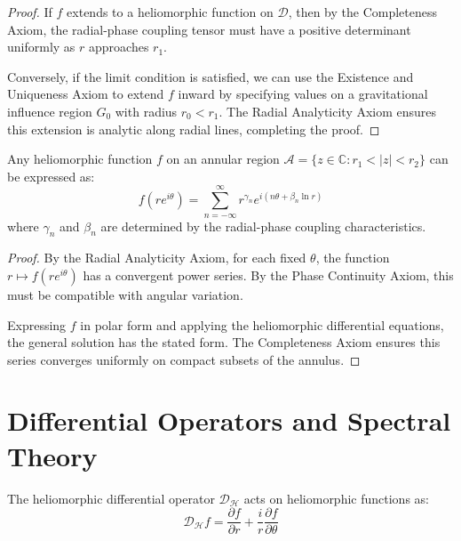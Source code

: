 \begin{proof}
If $f$ extends to a heliomorphic function on $\mathcal{D}$, then by the Completeness Axiom, the radial-phase coupling tensor must have a positive determinant uniformly as $r$ approaches $r_1$.

Conversely, if the limit condition is satisfied, we can use the Existence and Uniqueness Axiom to extend $f$ inward by specifying values on a gravitational influence region $G_0$ with radius $r_0 < r_1$. The Radial Analyticity Axiom ensures this extension is analytic along radial lines, completing the proof.
\end{proof}

\begin{theorem}
Any heliomorphic function $f$ on an annular region $\mathcal{A} = \{z \in \mathbb{C} : r_1 < |z| < r_2\}$ can be expressed as:
\begin{equation}
f(re^{i\theta}) = \sum_{n=-\infty}^{\infty} r^{\gamma_n} e^{i(n\theta + \beta_n \ln r)}
\end{equation}
where $\gamma_n$ and $\beta_n$ are determined by the radial-phase coupling characteristics.
\end{theorem}

\begin{proof}
By the Radial Analyticity Axiom, for each fixed $\theta$, the function $r \mapsto f(re^{i\theta})$ has a convergent power series. By the Phase Continuity Axiom, this must be compatible with angular variation.

Expressing $f$ in polar form and applying the heliomorphic differential equations, the general solution has the stated form. The Completeness Axiom ensures this series converges uniformly on compact subsets of the annulus.
\end{proof}

\section{Differential Operators and Spectral Theory}

\begin{definition}
The heliomorphic differential operator $\mathcal{D}_{\mathcal{H}}$ acts on heliomorphic functions as:
\begin{equation}
\mathcal{D}_{\mathcal{H}}f = \frac{\partial f}{\partial r} + \frac{i}{r}\frac{\partial f}{\partial \theta}
\end{equation}
\end{definition}

